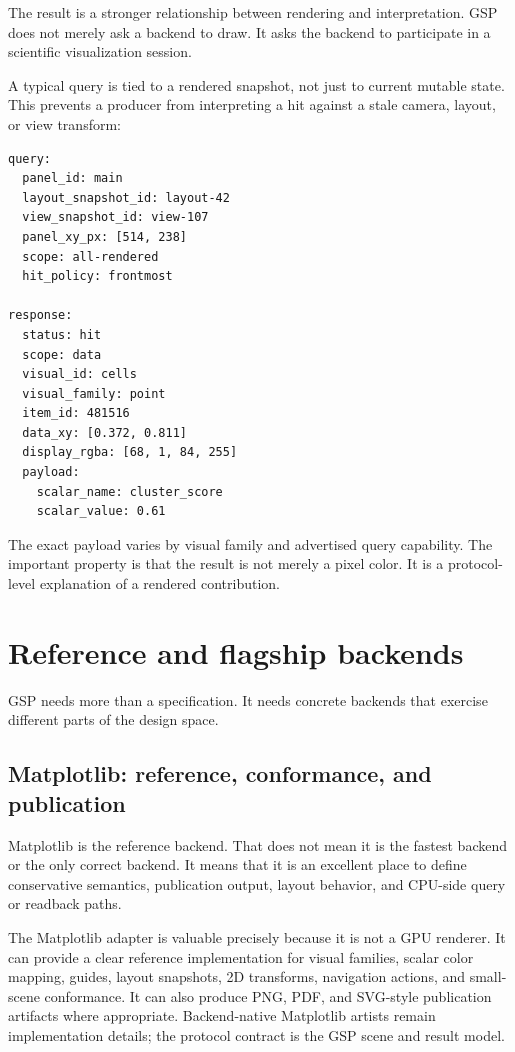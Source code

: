 \documentclass[a4paper,11pt]{article}
\newcommand{\gsp}{GSP\xspace}
\newcommand{\matplotlib}{Matplotlib\xspace}
\begin{document}
The result is a stronger relationship between rendering and interpretation. \gsp does not merely
ask a backend to draw. It asks the backend to participate in a scientific visualization session.

A typical query is tied to a rendered snapshot, not just to current mutable state. This prevents a
producer from interpreting a hit against a stale camera, layout, or view transform:

\begin{lstlisting}[float=htbp,caption={Illustrative panel query and response.}]
query:
  panel_id: main
  layout_snapshot_id: layout-42
  view_snapshot_id: view-107
  panel_xy_px: [514, 238]
  scope: all-rendered
  hit_policy: frontmost

response:
  status: hit
  scope: data
  visual_id: cells
  visual_family: point
  item_id: 481516
  data_xy: [0.372, 0.811]
  display_rgba: [68, 1, 84, 255]
  payload:
    scalar_name: cluster_score
    scalar_value: 0.61
\end{lstlisting}

The exact payload varies by visual family and advertised query capability. The important property
is that the result is not merely a pixel color. It is a protocol-level explanation of a rendered
contribution.

\section{Reference and flagship backends}

\gsp needs more than a specification. It needs concrete backends that exercise different parts of
the design space.

\subsection{\matplotlib: reference, conformance, and publication}

\matplotlib is the reference backend. That does not mean it is the fastest backend or the only
correct backend. It means that it is an excellent place to define conservative semantics, publication
output, layout behavior, and CPU-side query or readback paths.

The \matplotlib adapter is valuable precisely because it is not a GPU renderer. It can provide a
clear reference implementation for visual families, scalar color mapping, guides, layout snapshots,
2D transforms, navigation actions, and small-scene conformance. It can also produce PNG, PDF, and
SVG-style publication artifacts where appropriate. Backend-native \matplotlib artists remain
implementation details; the protocol contract is the \gsp scene and result model.
\end{document}

